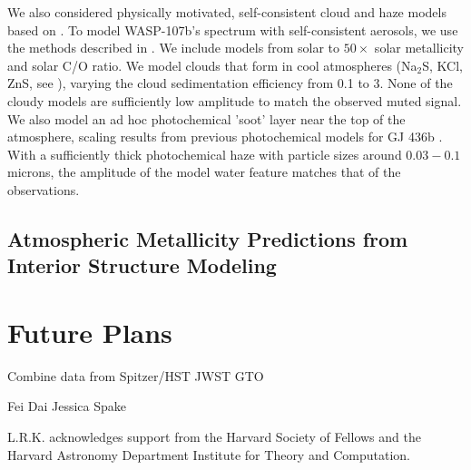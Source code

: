 \documentclass[twocolumn]{aastex61}
\begin{document}
We also considered physically motivated, self-consistent cloud and haze models based on .  To model WASP-107b's spectrum with self-consistent aerosols, we use the methods described in \citep{fortney08, morley15}. We include models from solar to $50\times$ solar metallicity and solar C/O ratio. We model clouds that form in cool atmospheres (Na$_2$S, KCl, ZnS, see \citealt{morley12}), varying the cloud sedimentation efficiency from 0.1 to 3. None of the cloudy models are sufficiently low amplitude to match the observed muted signal. We also model an ad hoc photochemical 'soot' layer near the top of the atmosphere, scaling results from previous photochemical models for GJ 436b \citep{line11, morley17}. With a sufficiently thick photochemical haze with particle sizes around $0.03-0.1$ microns, the amplitude of the model water feature matches that of the observations. 



\subsection{Atmospheric Metallicity Predictions from Interior Structure Modeling}


\section{Future Plans}
Combine data from Spitzer/HST
JWST GTO


\acknowledgments
Fei Dai
Jessica Spake

L.R.K. acknowledges support from the Harvard Society of Fellows and the Harvard Astronomy Department Institute for Theory and Computation.

\vspace{5mm}



\end{document}
